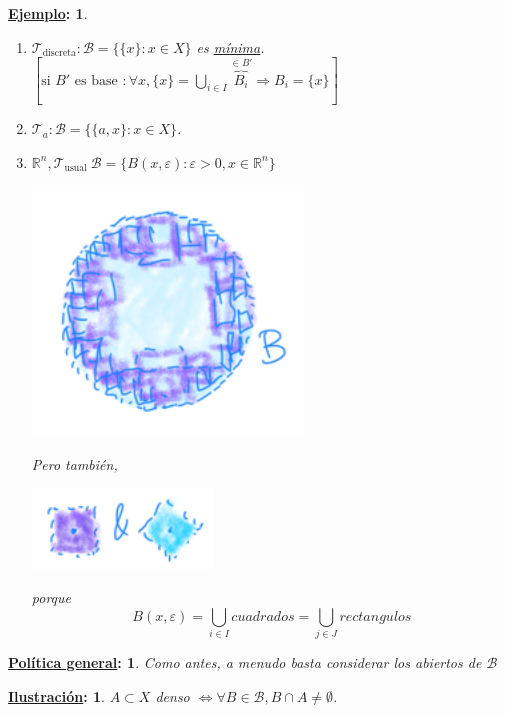 \documentclass[10pt,a4paper,openright]{book}
\theoremstyle{break}
\newtheorem*{ej}{\underline{Ejemplo}:}
\newtheorem*{pg}{\underline{Política general}:}
\newtheorem*{il}{\underline{Ilustración}:}
\begin{document}
\begin{ej}
\begin{enumerate}
    \item $\mathcal{T}_{\text{discreta}} : \mathcal{B} = \{\{x\} : x \in X\}$ es \underline{mínima}. $\left[ \text{si } B' \text{ es base } : \forall x, \{x\} = \bigcup_{i \in  I} \overbrace{B_i}^{\in B'} \Rightarrow B_i = \{x\} \right]$ 
    \item $\mathcal{T}_a: \mathcal{B} = \{\{a, x\} : x \in X\}$.
    \item $\mathbb{R}^n, \mathcal{T}_{\text{usual}}\ \mathcal{B} = \{B\left( x, \varepsilon \right) : \varepsilon > 0, x \in \mathbb{R}^n\}$
    \begin{center}
        \includegraphics[scale=0.3]{images/base_rn} 
    \end{center}
    Pero también,
    \begin{center}
        \includegraphics[scale=0.3]{images/bases_alternativas_rn} 
    \end{center}
    porque
    \[
    B\left( x, \varepsilon \right) = \bigcup_{i \in  I} cuadrados = \bigcup_{j \in J} rectangulos
    \]
\end{enumerate}
\end{ej}

\begin{pg}
    Como antes, a menudo basta considerar los abiertos de $\mathcal{B}$ 
\end{pg}

\begin{il}
$A \subset X$ denso $\Leftrightarrow \forall B \in \mathcal{B}, B \cap A \neq \emptyset$.
\end{il}
\end{document}
